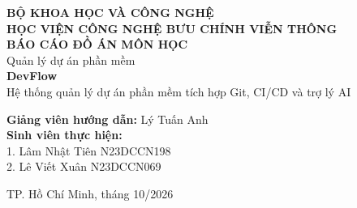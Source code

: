 \documentclass[12pt,a4paper]{report}
\begin{document}
\begin{titlepage}
\begin{center}
{\large \textbf{BỘ KHOA HỌC VÀ CÔNG NGHỆ}}\\[0.3cm]
{\large \textbf{HỌC VIỆN CÔNG NGHỆ BƯU CHÍNH VIỄN THÔNG}}\\[1.5cm]
{\Large \textbf{BÁO CÁO ĐỒ ÁN MÔN HỌC}}\\[0.3cm]
{\large Quản lý dự án phần mềm}\\[1.5cm]
{\LARGE \textbf{DevFlow}}\\[0.3cm]
{\large Hệ thống quản lý dự án phần mềm tích hợp Git, CI/CD và trợ lý AI}
\vfill
\begin{flushleft}
\hspace{2cm}
\begin{minipage}{0.78\textwidth}
\textbf{Giảng viên hướng dẫn:} Lý Tuấn Anh\\[0.4cm]
\textbf{Sinh viên thực hiện:}\\[0.2cm]
1. Lâm Nhật Tiên \hfill N23DCCN198\\[0.2cm]
2. Lê Viết Xuân \hfill N23DCCN069
\end{minipage}
\end{flushleft}
\vfill
{\large TP. Hồ Chí Minh, tháng 10/2026}
\end{center}
\end{titlepage}


\end{document}
